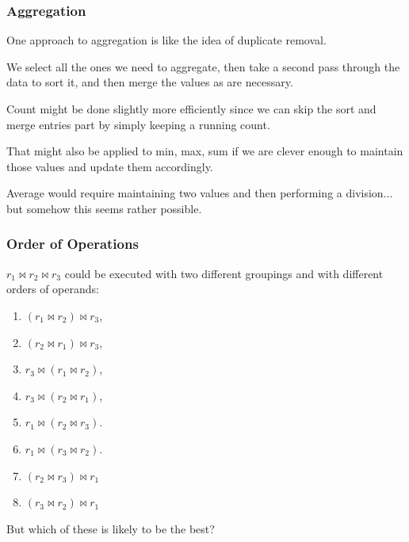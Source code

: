 \begin{frame}
\frametitle{Aggregation}

One approach to aggregation is like the idea of duplicate removal. 

We select all the ones we need to aggregate, then take a second pass through the data to sort it, and then merge the values as are necessary.

Count might be done slightly more efficiently since we can skip the sort and merge entries part by simply keeping a running count. 

That might also be applied to min, max, sum if we are clever enough to maintain those values and update them accordingly. 

Average would require maintaining two values and then performing a division... but somehow this seems rather possible.



\end{frame}
















\begin{frame}
\frametitle{Order of Operations}

$r_{1} \bowtie r_{2} \bowtie r_{3}$ could be executed with two different groupings and with different orders of operands: 


\begin{enumerate}
\item $(r_{1} \bowtie r_{2}) \bowtie r_{3}$,  
\item $(r_{2} \bowtie r_{1}) \bowtie r_{3}$, 
\item $r_{3} \bowtie (r_{1} \bowtie r_{2})$,
\item $r_{3} \bowtie (r_{2} \bowtie r_{1})$,
\item $r_{1} \bowtie (r_{2} \bowtie r_{3})$. 
\item $r_{1} \bowtie (r_{3} \bowtie r_{2})$. 
\item $(r_{2} \bowtie r_{3}) \bowtie r_{1}$
\item $(r_{3} \bowtie r_{2}) \bowtie r_{1}$
\end{enumerate}

But which of these is likely to be the best?

\end{frame}




